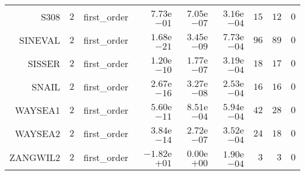 \begin{longtable}{rrrrrrrrr}
S308 & \(     2\) & first\_order & \( 7.73\)e\(-01\) & \( 7.05\)e\(-07\) & \( 3.16\)e\(-04\) & \(    15\) & \(    12\) & \(     0\) \\
SINEVAL & \(     2\) & first\_order & \( 1.68\)e\(-21\) & \( 3.45\)e\(-09\) & \( 7.73\)e\(-04\) & \(    96\) & \(    89\) & \(     0\) \\
SISSER & \(     2\) & first\_order & \( 1.20\)e\(-10\) & \( 1.77\)e\(-07\) & \( 3.19\)e\(-04\) & \(    18\) & \(    17\) & \(     0\) \\
SNAIL & \(     2\) & first\_order & \( 2.67\)e\(-16\) & \( 3.27\)e\(-08\) & \( 2.53\)e\(-04\) & \(    16\) & \(    16\) & \(     0\) \\
WAYSEA1 & \(     2\) & first\_order & \( 5.60\)e\(-11\) & \( 8.51\)e\(-04\) & \( 5.94\)e\(-04\) & \(    42\) & \(    28\) & \(     0\) \\
WAYSEA2 & \(     2\) & first\_order & \( 3.84\)e\(-14\) & \( 2.72\)e\(-07\) & \( 3.52\)e\(-04\) & \(    24\) & \(    18\) & \(     0\) \\
ZANGWIL2 & \(     2\) & first\_order & \(-1.82\)e\(+01\) & \( 0.00\)e\(+00\) & \( 1.90\)e\(-04\) & \(     3\) & \(     3\) & \(     0\) \\\hline
\end{longtable}
